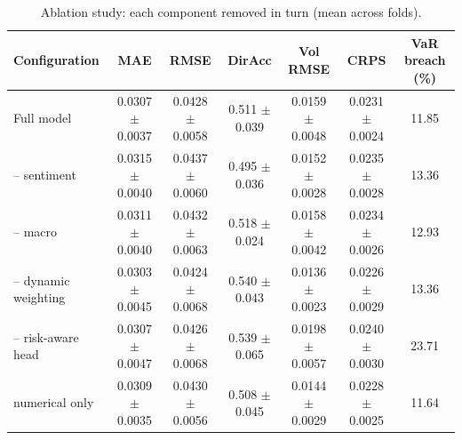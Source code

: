 \begin{table}
\caption{Ablation study: each component removed in turn (mean across folds).}
\label{tab:ablation}
\begin{tabular}{lcccccc}
\toprule
Configuration & MAE & RMSE & DirAcc & Vol RMSE & CRPS & VaR breach (\%) \\
\midrule
Full model & 0.0307 $\pm$ 0.0037 & 0.0428 $\pm$ 0.0058 & 0.511 $\pm$ 0.039 & 0.0159 $\pm$ 0.0048 & 0.0231 $\pm$ 0.0024 & 11.85 \\
-- sentiment & 0.0315 $\pm$ 0.0040 & 0.0437 $\pm$ 0.0060 & 0.495 $\pm$ 0.036 & 0.0152 $\pm$ 0.0028 & 0.0235 $\pm$ 0.0028 & 13.36 \\
-- macro & 0.0311 $\pm$ 0.0040 & 0.0432 $\pm$ 0.0063 & 0.518 $\pm$ 0.024 & 0.0158 $\pm$ 0.0042 & 0.0234 $\pm$ 0.0026 & 12.93 \\
-- dynamic weighting & 0.0303 $\pm$ 0.0045 & 0.0424 $\pm$ 0.0068 & 0.540 $\pm$ 0.043 & 0.0136 $\pm$ 0.0023 & 0.0226 $\pm$ 0.0029 & 13.36 \\
-- risk-aware head & 0.0307 $\pm$ 0.0047 & 0.0426 $\pm$ 0.0068 & 0.539 $\pm$ 0.065 & 0.0198 $\pm$ 0.0057 & 0.0240 $\pm$ 0.0030 & 23.71 \\
numerical only & 0.0309 $\pm$ 0.0035 & 0.0430 $\pm$ 0.0056 & 0.508 $\pm$ 0.045 & 0.0144 $\pm$ 0.0029 & 0.0228 $\pm$ 0.0025 & 11.64 \\
\bottomrule
\end{tabular}
\end{table}
